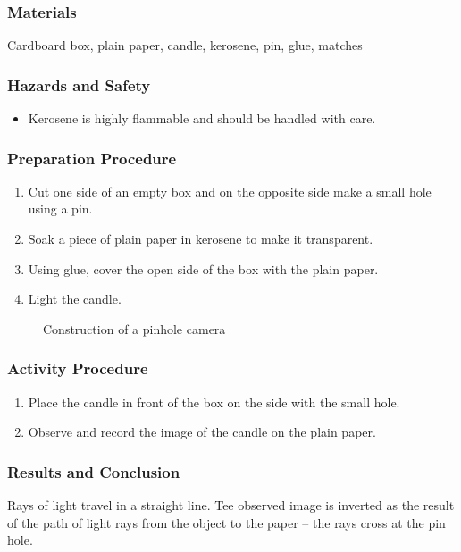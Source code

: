 \subsubsection*{Materials}
Cardboard box, plain paper, candle, kerosene, pin, glue, matches

\subsubsection*{Hazards and Safety}
\begin{itemize}
\item{Kerosene is highly flammable and should be handled with care.} 
\end{itemize}

\subsubsection*{Preparation Procedure}
\begin{enumerate}
\item{Cut one side of an empty box and on the opposite side make a small hole using a pin.} 
\item{Soak a piece of plain paper in kerosene to make it transparent.} 
\item{Using glue, cover the open side of the box with the plain paper.} 
\item{Light the candle.} 
\end{enumerate}

\begin{figure}
\begin{center}
\def\svgwidth{250pt}

\caption{Construction of a pinhole camera}
\label{fig:pinhole-camera}
\end{center}
\end{figure}

\subsubsection*{Activity Procedure}
\begin{enumerate}
\item{Place the candle in front of the box on the side with the small hole.} 
\item{Observe and record the image of the candle on the plain paper.} 
\end{enumerate}

\subsubsection*{Results and Conclusion}
Rays of light travel in a straight line. Tee observed image is inverted as the result of the path of light rays from the object to the paper -- the rays cross at the pin hole.

